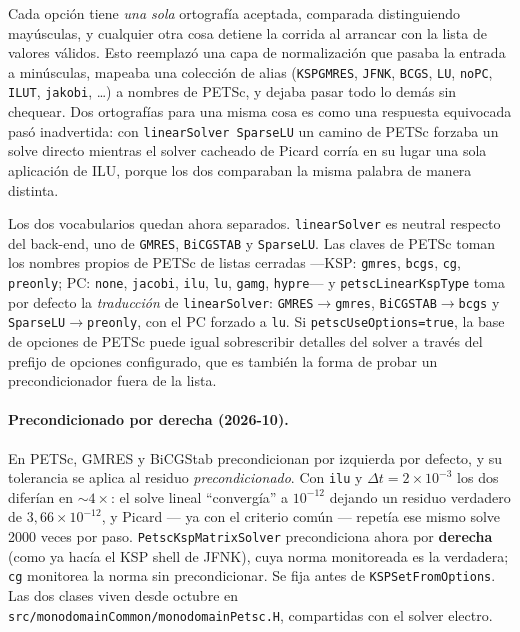 \documentclass[11pt,a4paper]{article}
\newcommand{\code}[1]{\texttt{\small #1}}
\begin{document}
Cada opción tiene \emph{una sola} ortografía aceptada, comparada distinguiendo mayúsculas, y
cualquier otra cosa detiene la corrida al arrancar con la lista de valores válidos. Esto
reemplazó una capa de normalización que pasaba la entrada a minúsculas, mapeaba una colección
de alias (\code{KSPGMRES}, \code{JFNK}, \code{BCGS}, \code{LU}, \code{noPC}, \code{ILUT},
\code{jakobi}, \ldots) a nombres de PETSc, y dejaba pasar todo lo demás sin chequear. Dos
ortografías para una misma cosa es como una respuesta equivocada pasó inadvertida: con
\code{linearSolver SparseLU} un camino de PETSc forzaba un solve directo mientras el solver
cacheado de Picard corría en su lugar una sola aplicación de ILU, porque los dos comparaban la
misma palabra de manera distinta.

Los dos vocabularios quedan ahora separados. \code{linearSolver} es neutral respecto del
back-end, uno de \code{GMRES}, \code{BiCGSTAB} y \code{SparseLU}. Las claves de PETSc toman
los nombres propios de PETSc de listas cerradas ---KSP: \code{gmres}, \code{bcgs}, \code{cg},
\code{preonly}; PC: \code{none}, \code{jacobi}, \code{ilu}, \code{lu}, \code{gamg},
\code{hypre}--- y \code{petscLinearKspType} toma por defecto la \emph{traducción} de
\code{linearSolver}: \code{GMRES}$\to$\code{gmres}, \code{BiCGSTAB}$\to$\code{bcgs} y
\code{SparseLU}$\to$\code{preonly}, con el PC forzado a \code{lu}. Si
\code{petscUseOptions=true}, la base de opciones de PETSc puede igual sobrescribir detalles
del solver a través del prefijo de opciones configurado, que es también la forma de probar un
precondicionador fuera de la lista.

\paragraph{Precondicionado por derecha (2026-10).} En PETSc, GMRES y BiCGStab precondicionan
por izquierda por defecto, y su tolerancia se aplica al residuo \emph{precondicionado}. Con
\code{ilu} y $\Delta t=2\times10^{-3}$ los dos diferían en $\sim4\times$: el solve lineal
``convergía'' a $10^{-12}$ dejando un residuo verdadero de $3{,}66\times10^{-12}$, y Picard
--- ya con el criterio común --- repetía ese mismo solve 2000 veces por paso.
\code{PetscKspMatrixSolver} precondiciona ahora por \textbf{derecha} (como ya hacía el KSP
shell de JFNK), cuya norma monitoreada es la verdadera; \code{cg} monitorea la norma sin
precondicionar. Se fija antes de \code{KSPSetFromOptions}. Las dos clases viven desde octubre
en \code{src/monodomainCommon/monodomainPetsc.H}, compartidas con el solver electro.
\end{document}
